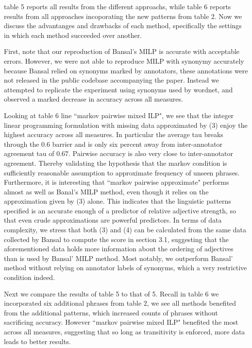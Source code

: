 \documentclass[11pt,letterpaper]{article}
\begin{document}
table 5 reports all results from the different approachs, while table 6 reports results from all approaches incoporating the new patterns from table 2. Now we discuss the advantanges and drawbacks of each method, specifically the settings in which each method succeeded over another. 

First, note that our reproduction of Bansal's MILP is accurate with acceptable errors. However, we were not able to reproduce MILP with synonymy accurately because Bansal relied on synonyms marked by annotators, these annotations were not released in the public codebase accompanying the paper. Instead we attempted to replicate the experiment using synonyms used by wordnet, and observed a marked decrease in accuracy across all measures. 

Looking at table 6 line ``markov pairwise mixed ILP", we see that the integer linear programming formulation with missing data approximated by (3) enjoy the highest accuracy across all measures. In particular the average tau breaks through the $0.6$ barrier and is only six percent away from inter-annotator agreement tau of $0.67$. Pairwise accuracy is also very close to inter-annotator agreement. Thereby validating the hypothesis that the markov condition is sufficiently reasonable assumption to approximate frequency of unseen phrases. Furthermore, it is interesting that ``markov pairwise approximate" performs almost as well as Banal's MILP method, even though it relies on the approximation given by (3) alone. This indicates that the linguistic patterns specified is an accurate enough of a predictor of relative adjective strength, so that even crude approximations are powerful predictors. In terms of data complexity, we stress that both (3) and (4) can be calculated from the same data collected by Bansal to compute the score in section 3.1, suggesting that the aforementioned data holds more information about the ordering of adjectives than is used by Bansal' MILP method. Most notably, we outperform Bansal' method without relying on annotator labels of synonyms, which a very restrictive condition indeed.

Next we compare the results of table 5 to that of 5. Recall in table 6 we incorporated six additional phrases from table 2, we see all methods benefited from the additional patterns, which increased counts of phrases without sacrificing accuracy. However ``markov pairwise mixed ILP" benefited the most across all measures, suggesting that so long as transitivity is enforced, more data leads to better results. 
\end{document}
